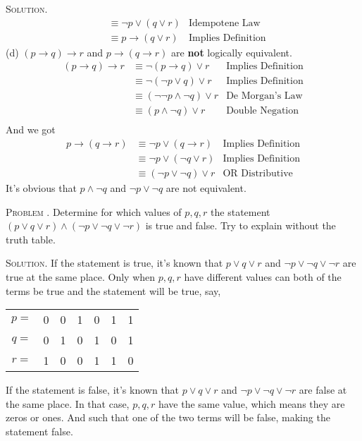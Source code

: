 \documentclass[12pt, a4paper, oneside]{article}
\newcounter{problemname}
\newenvironment{problem}{\stepcounter{problemname}\par\noindent\textsc{Problem \arabic{problemname}. }}{\\\par}
\newenvironment{solution}{\par\noindent\textsc{Solution. }}{\\\par}
\begin{document}
\begin{solution}
\begin{align*}
    &\equiv \neg p \vee \left(q \vee r \right)&\text{Idempotene Law} \\
    &\equiv p \rightarrow \left(q \vee r \right)&\text{Implies Definition}
\end{align*}
\newline\noindent(d) $\left( p \rightarrow q\right) \rightarrow r$ and $p \rightarrow \left( q \rightarrow r \right)$ are \textbf{not} logically equivalent.
\begin{align*}
    \left( p \rightarrow q\right) \rightarrow r &\equiv \neg \left(p \rightarrow q\right) \vee r &\text{Implies Definition} \\
    &\equiv \neg \left(\neg p \vee q\right) \vee r &\text{Implies Definition} \\
    &\equiv \left(\neg \neg p \wedge \neg q\right) \vee r &\text{De Morgan's Law} \\
    &\equiv \left(p \wedge \neg q\right) \vee r &\text{Double Negation} \\
\end{align*}
And we got
\begin{align*}
    p \rightarrow \left(q \rightarrow r \right)&\equiv \neg p \vee \left(q \rightarrow r \right)&\text{Implies Definition} \\
    &\equiv \neg p \vee \left(\neg q \vee r \right)&\text{Implies Definition} \\
    &\equiv \left(\neg p \vee \neg q\right) \vee r &\text{OR Distributive}
\end{align*}
It's obvious that $p \wedge \neg q$ and $\neg p \vee \neg q$ are not equivalent.
\end{solution}

\begin{problem}
    Determine for which values of $p, q, r$ the statement $\left(p \vee q \vee r\right) \wedge \left(\neg p \vee \neg q \vee \neg r\right)$ is true and false.
    Try to explain without the truth table.
\end{problem}

\begin{solution}
    If the statement is true, it's known that $p \vee q \vee r$ and $\neg p \vee \neg q \vee \neg r$ are true at the same place. Only when $p,q,r$ have different values can both of the terms be true and the statement will be true, say,
\begin{table}[!htbp]
\centering
\begin{tabular}{ccccccc}
    $p=$ & 0 & 0 & 1 & 0 & 1 & 1 \\
    $q=$ & 0 & 1 & 0 & 1 & 0 & 1 \\
    $r=$ & 1 & 0 & 0 & 1 & 1 & 0 \\
\end{tabular}
\end{table}
\newline
    If the statement is false, it's known that $p \vee q \vee r$ and $\neg p \vee \neg q \vee \neg r$ are false at the same place. In that case, $p,q,r$ have the same value, which means they are zeros or ones. And such that one of the two terms will be false, making the statement false.
\end{solution}
\end{document}
